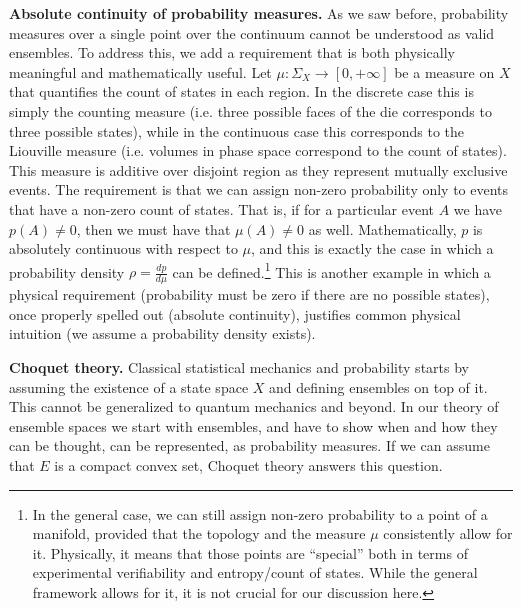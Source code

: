 \documentclass[10pt,twocolumn, nofootinbib]{revtex4-2}
\begin{document}
\textbf{Absolute continuity of probability measures.} As we saw before, probability measures over a single point over the continuum cannot be understood as valid ensembles. To address this, we add a requirement that is both physically meaningful and mathematically useful. Let $\mu : \Sigma_X \to [0, + \infty]$ be a measure on $X$ that quantifies the count of states in each region. In the discrete case this is simply the counting measure (i.e. three possible faces of the die corresponds to three possible states), while in the continuous case this corresponds to the Liouville measure (i.e. volumes in phase space correspond to the count of states). This measure is additive over disjoint region as they represent mutually exclusive events. The requirement is that we can assign non-zero probability only to events that have a non-zero count of states. That is, if for a particular event $A$ we have $p(A) \neq 0$, then we must have that $\mu(A) \neq 0$ as well. Mathematically, $p$ is absolutely continuous with respect to $\mu$, and this is exactly the case in which a probability density $\rho = \frac{dp}{d\mu}$ can be defined.\footnote{In the general case, we can still assign non-zero probability to a point of a manifold, provided that the topology and the measure $\mu$ consistently allow for it. Physically, it means that those points are ``special'' both in terms of experimental verifiability and entropy/count of states. While the general framework allows for it, it is not crucial for our discussion here.} This is another example in which a physical requirement (probability must be zero if there are no possible states), once properly spelled out (absolute continuity), justifies common physical intuition (we assume a probability density exists).

\textbf{Choquet theory.} Classical statistical mechanics and probability starts by assuming the existence of a state space $X$ and defining ensembles on top of it. This cannot be generalized to quantum mechanics and beyond. In our theory of ensemble spaces we start with ensembles, and have to show when and how they can be thought, can be represented, as probability measures. If we can assume that $E$ is a compact convex set, Choquet theory answers this question.
\end{document}
